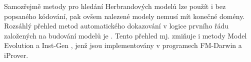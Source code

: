 Samozřejmě metody pro hledání Herbrandových modelů lze použít
i bez popsaného kódování, pak ovšem nalezené modely nemusí
mít konečné domény. Rozsáhlý přehled metod automatického dokazování
v logice prvního řádu za\-lo\-že\-ných na budování
modelů je \cite{bonacina2015}. Tento přehled mj. zmiňuje
i metody Model Evolution \cite{modelevolution}
a Inst-Gen \cite{instgen}, jenž jsou implementovány
v programech FM-Darwin a iProver.

